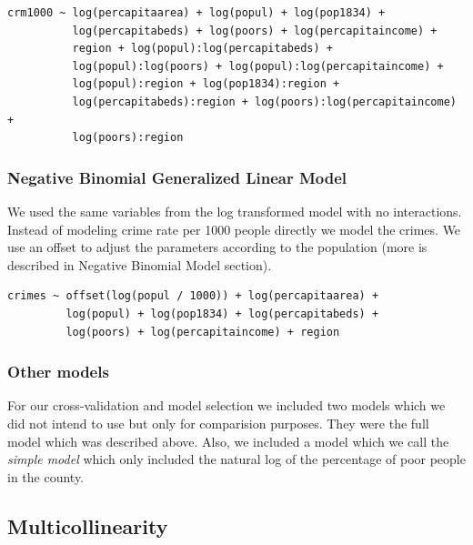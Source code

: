 \documentclass[]{article}
\begin{document}
\begin{verbatim}
crm1000 ~ log(percapitaarea) + log(popul) + log(pop1834) +
          log(percapitabeds) + log(poors) + log(percapitaincome) +
          region + log(popul):log(percapitabeds) +
          log(popul):log(poors) + log(popul):log(percapitaincome) +
          log(popul):region + log(pop1834):region +
          log(percapitabeds):region + log(poors):log(percapitaincome) +
          log(poors):region
\end{verbatim}

\subsubsection{Negative Binomial Generalized Linear
Model}\label{negative-binomial-generalized-linear-model}

We used the same variables from the log transformed model with no
interactions. Instead of modeling crime rate per 1000 people directly we
model the crimes. We use an offset to adjust the parameters according to
the population (more is described in Negative Binomial Model section).

\begin{verbatim}
crimes ~ offset(log(popul / 1000)) + log(percapitaarea) +
         log(popul) + log(pop1834) + log(percapitabeds) +
         log(poors) + log(percapitaincome) + region
\end{verbatim}

\subsubsection{Other models}\label{other-models}

For our cross-validation and model selection we included two models
which we did not intend to use but only for comparision purposes. They
were the full model which was described above. Also, we included a model
which we call the \emph{simple model} which only included the natural
log of the percentage of poor people in the county.

\subsection{Multicollinearity}\label{multicollinearity}
\end{document}
